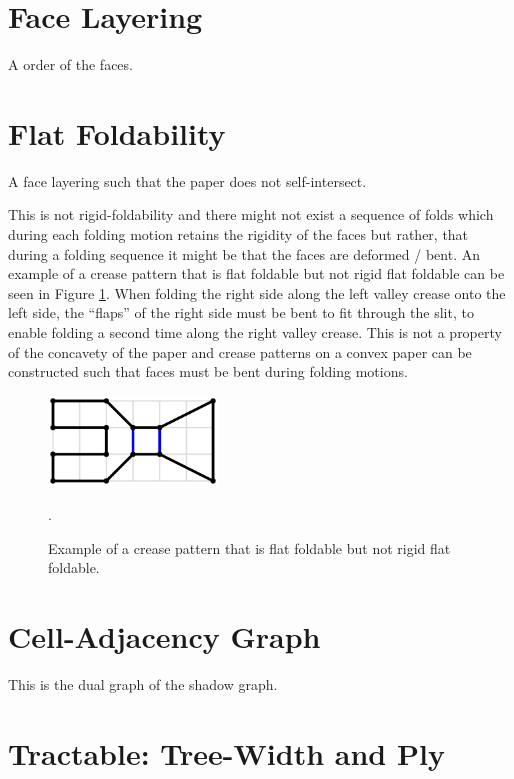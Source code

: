 \section{Face Layering}

A order of the faces.


\section{Flat Foldability}

A face layering such that the paper does not self-intersect.

This is not rigid-foldability and there might not exist a sequence of folds which during each folding motion retains the rigidity of the faces but rather, that during a folding sequence it might be that the faces are deformed / bent.
An example of a crease pattern that is flat foldable but not rigid flat foldable can be seen in Figure \ref{fig:example_non_rigid}.
When folding the right side along the left valley crease onto the left side, the ``flaps'' of the right side must be bent to fit through the slit, to enable folding a second time along the right valley crease.
This is not a property of the concavety of the paper and crease patterns on a convex paper can be constructed such that faces must be bent during folding motions.

\begin{figure}[h]
\centering
\includegraphics[width=0.4\textwidth]{assets/example_non_rigid.png}
\caption{Example of a crease pattern that is flat foldable but not rigid flat foldable.}.
\label{fig:example_non_rigid}
\end{figure}



\section{Cell-Adjacency Graph}

This is the dual graph of the shadow graph.

\section{Tractable: Tree-Width and Ply}

